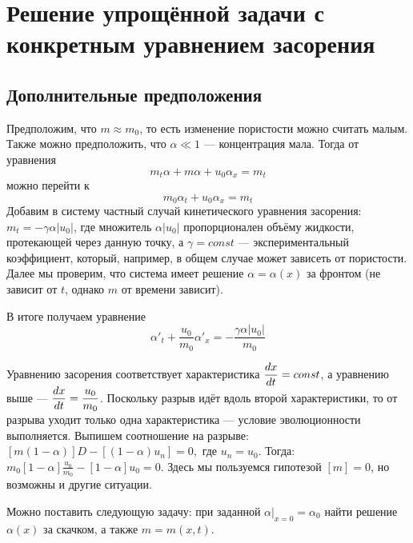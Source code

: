 \section{Решение упрощённой задачи с конкретным уравнением засорения}
\subsection{Дополнительные предположения}
\par Предположим, что $m\approx m_{0}$, то есть изменение пористости можно считать малым. Также можно предположить, что $\alpha\ll 1$ --- концентрация мала. Тогда от уравнения $$m_{t}\alpha + m\alpha+u_{0}\alpha_{x}=m_{t}$$ можно перейти к $$m_{0}\alpha_{t}+u_{0}\alpha_{x}=m_{t}$$ Добавим в систему частный случай кинетического уравнения засорения: $m_{t}=-\gamma \alpha |u_{0}|$, где множитель $\alpha |u_{0}|$ пропорционален объёму жидкости, протекающей через данную точку, а $\gamma=const$ --- экспериментальный коэффициент, который, например, в общем случае может зависеть от пористости. Далее мы проверим, что система имеет решение $\alpha=\alpha(x)$ за фронтом (не зависит от $t$, однако $m$ от времени зависит).\\
\par В итоге получаем уравнение $$\alpha'_{t}+\frac{u_{0}}{m_{0}}\alpha'_{x}=-\frac{\gamma\alpha |u_{0}|}{m_{0}}$$ 
\par Уравнению засорения соответствует характеристика $\displaystyle \frac{dx}{dt}=const$, а уравнению выше --- $\displaystyle\frac{dx}{dt}=\frac{u_{0}}{m_{0}}$. Поскольку разрыв идёт вдоль второй характеристики, то от разрыва уходит только одна характеристика --- условие эволюционности выполняется. Выпишем соотношение на разрыве: $[m(1-\alpha)]D-[(1-\alpha)u_{n}]=0,$ где $u_{n}=u_{0}$. Тогда: $m_{0}[1-\alpha]\frac{u_{0}}{m_{0}}-[1-\alpha]u_{0}=0$. Здесь мы пользуемся гипотезой $[m]=0$, но возможны и другие ситуации. \\
\par Можно поставить следующую задачу: при заданной $\alpha|_{x=0}=\alpha_{0}$ найти решение $\alpha(x)$ за скачком, а также $m=m(x,t)$. 
